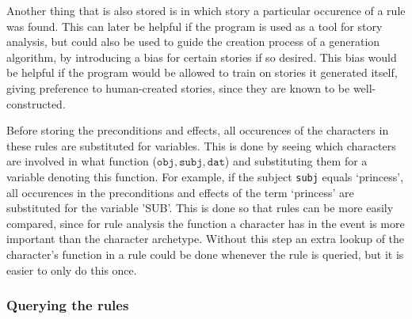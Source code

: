 Another thing that is also stored is in which story a particular occurence of a
rule was found. This can later be helpful if the program is used as a tool for
story analysis, but could also be used to guide the creation process of a
generation algorithm, by introducing a bias for certain stories if so desired.
This bias would be helpful if the program would be allowed to train on stories
it generated itself, giving preference to human-created stories, since they are
known to be well-constructed.

Before storing the preconditions and effects, all occurences of the characters
in these rules are substituted for variables. This is done by seeing which
characters are involved in what function ($\texttt{obj}, \texttt{subj}, \texttt{dat}$)
and substituting them for a variable denoting this function. For example, if the
subject \texttt{subj} equals `princess', all occurences in the preconditions and
effects of the term `princess' are substituted for the variable 'SUB'. This is
done so that rules can be more easily compared, since for rule analysis the
function a character has in the event is more important than the character
archetype. Without this step an extra
lookup of the character's function in a rule could be done whenever the rule 
is queried, but it is easier to only do this once.

\subsubsection{Querying the rules}

